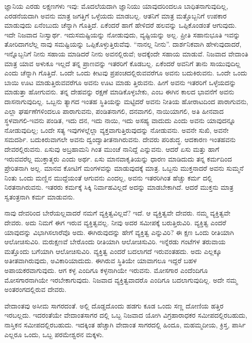 ಜ್ಞಾನಿಯ ಎರಡು ಲಕ್ಷಣಗಳು ಇವು: ಮೊದಲೆಯದಾಗಿ ಜ್ಞಾನಿಯು ಯಾವುದರಿಂದಲೂ ಬಾಧಿತನಾಗುವುದಿಲ್ಲ, ಎರಡನೆಯದಾಗಿ ಅವನು ಮಾತ್ರ ಜಗತ್ತಿಗೆ ಒಳ್ಳೆಯದು ಮಾಡಬಲ್ಲ. ಆತನಿಗೆ ಮಾತ್ರ ಮತ್ತೊಬ್ಬನಿಗೆ ಉಪಕಾರ ಮಾಡುವುದು ಏನೆಂಬುದು ಚೆನ್ನಾಗಿ ಗೊತ್ತಿದೆ. ಏಕೆಂದರೆ ಹಾಗೆ ಹೇಳಿದರೆ ಹಲವನ್ನು ಒಪ್ಪಿಕೊಂಡಂತೆ ಆಗುವುದು. ಇದೇ ನಿಜವಾದ ನಿಃಸ್ವಾರ್ಥ. ಇದುಸಮಷ್ಟಿಯನ್ನು ನೋಡುವುದು, ವ್ಯಷ್ಟಿಯನ್ನು ಅಲ್ಲ. ಪ್ರೀತಿ ಸಹಾನುಭೂತಿ ಇವನ್ನು ತೋರಿದಾಗಲೆಲ್ಲ ನಾವು ಸಮಷ್ಟಿಯನ್ನು ಒಪ್ಪಿಕೊಳ್ಳುತ್ತಿರುವೆವು. “ನಾನಲ್ಲ ನೀನು”. ದಾರ್ಶನಿಕವಾಗಿ ಹೇಳುವುದಾದರೆ, ಇನ್ನೊಬ್ಬನಿಗೆ ನೀನು ಸಹಾಯ ಮಾಡಿದರೆ ನೀನು ಅವನಲ್ಲಿರುವೆ; ಅದಕ್ಕೆಂದೇ ಸಹಾಯ ಮಾಡುವೆ. ನಿಜವಾದ ವೇದಾಂತಿ ಮಾತ್ರ ಯಾವ ಅಳುಕೂ ಇಲ್ಲದೆ ತನ್ನ ಪ್ರಾಣವನ್ನು ಇತರರಿಗೆ ಕೊಡಬಲ್ಲ. ಏಕೆಂದರೆ ಅವನಿಗೆ ತಾನು ಸಾಯುವುದಿಲ್ಲ ಎಂದು ಚೆನ್ನಾಗಿ ಗೊತ್ತಿದೆ. ಒಂದೇ ಒಂದು ಕೀಟವು ಪ್ರಪಂಚದಲ್ಲಿರುವವರೆಗೂ ಅವನು ಬದುಕಿರುವನು. ಒಂದೇ ಒಂದು ಬಾಯಿ ಊಟ ಮಾಡುತ್ತಿರುವವರೆಗೂ ಅವನು ಊಟ ಮಾಡು ತ್ತಿರುವನು. ಹೀಗೆ ಅವನು ಇತರರಿಗೆ ಒಳ್ಳೆಯದನ್ನು ಮಾಡುತ್ತಾ ಹೋಗುವನು. ತನ್ನ ದೇಹವನ್ನು ರಕ್ಷಣೆ ಮಾಡಿಕೊಳ್ಳಬೇಕು, ಎಂಬ ಈಗಿನ ಕಾಲದ ಭಾವನೆಗೆ ಅವನು ದಾಸನಾಗುವುದಿಲ್ಲ. ಒಬ್ಬನು ತ್ಯಾಗದ ಇಂತಹ ಸ್ಥಿತಿಯನ್ನು ಮಟ್ಟಿದರೆ ಅವನು ನೀತಿಯ ಹೋರಾಟದಿಂದ ಪಾರಾಗುವನು, ಎಲ್ಲಾ ಘರ್ಷಣೆಗಳಿಂದಲೂ ಪಾರಾಗುವನು, ಪಂಡಿತನಾಗಲಿ, ದನವಾಗಲಿ, ನಾಯಿಯಾಗಲಿ, ಅತಿ ಹೀನವಾದ ಸ್ಥಳವಾಗಲಿ-ಇವನು ಪಂಡಿತ, ಇದು ದನ, ಇದು ನಾಯಿ, ಇದು ಅಸಹ್ಯ ವಾದುದು ಎಂದು ಅವನು ಯಾವುದನ್ನೂ ನೋಡುವುದಿಲ್ಲ; ಒಂದೇ ಸತ್ಯ ಇವುಗಳಲ್ಲೆಲ್ಲಾ ವ್ಯಕ್ತವಾಗುತ್ತಿರುವುದನ್ನು ನೋಡುವನು. ಅವನೇ ಸುಖಿ, ಅವನೇ ಸಮದರ್ಶಿ. ಬದುಕಿರುವಾಗಲೇ ಅವನು ದ್ವಂದ್ವಾತೀತನಾಗಿರುವನು. ದೇವರು ಪರಿಶುದ್ಧ. ಆದಕಾರಣ ಇಂತಹವನು ದೇವರಲ್ಲಿರುವನು. ಏಸುವು ಅಬ್ರಹಾಮನಿ ಗಿಂತ ಮುಂಚೆ ನಾನಿದ್ದೆ ಎನ್ನುವನು. ಆದರೆ ಏಸು ಮತ್ತು ಹಾಗೆ ಇರುವವರೆಲ್ಲ ಮುಕ್ತಾತ್ಮರು ಎಂದು ಅರ್ಥ. ಏಸು ಮಾನವಾಕೃತಿಯನ್ನು ಧಾರಣ ಮಾಡಿದುದು ತನ್ನ ಕರ್ಮದಿಂದ ಪ್ರೇರಿತನಾಗಿ ಅಲ್ಲ. ಮಾನವ ಕೋಟಿಗೆ ಮಂಗಳವನ್ನು ಮಾಡುವುದಕ್ಕೆ ಮಾತ್ರ. ಒಬ್ಬನು ಮುಕ್ತನಾದರೆ ಅವನು ಸುಮ್ಮನೆ ನಿಂತು ಒಂದು ಮಣ್ಣಿನ ಮುದ್ದೆಯಂತೆ ಆಗುವನು ಎಂದಲ್ಲ, ಅವನು ಇತರರಿಗಿಂತ ಹೆಚ್ಚು ಕರ್ಮ ದಲ್ಲಿ ನಿರತನಾಗಿರುವನು. ಇತರರು ಕರ್ಮಕ್ಕೆ ಸಿಕ್ಕಿ ನಿರ್ವಾಹವಿಲ್ಲದೆ ಅದನ್ನು ಮಾಡಬೇಕಾಗಿದೆ. ಆದರೆ ಮುಕ್ತನು ಮಾತ್ರ ಸ್ವತಂತ್ರನಾಗಿ ಕರ್ಮ ಮಾಡುವನು.

ನಾವು ದೇವರಿಂದ ಬೇರೆಯಲ್ಲವಾದರೆ ನಮಗೆ ವ್ಯಕ್ತಿತ್ವವಿಲ್ಲವೆ? ಇದೆ. ಆ ವ್ಯಕ್ತಿತ್ವವೇ ದೇವರು. ನಮ್ಮ ವ್ಯಕ್ತಿತ್ವವೇ ದೇವರು. ಅದು ನಿಮಗೆ ಈಗ ಇರುವ ವ್ಯಕ್ತಿತ್ವವಲ್ಲ. ನೀವು ಅದರ ಸಮೀಪಕ್ಕೆ ಬರುತ್ತಿರುವಿರಿ. ವ್ಯಕ್ತಿತ್ವ ಎಂದರೆ ಯಾವುದನ್ನು ವಿಭಾಗಿಸಲಾರೆವೊ ಅದು. ಈಗಿರುವುದನ್ನು ಹೇಗೆ ವ್ಯಕ್ತಿತ್ವ ಎನ್ನುವಿರಿ? ಈ ಕ್ಷಣ ಒಂದು ರೀತಿಯಾಗಿ ಆಲೋಚಿಸುವಿರಿ. ಮರುಕ್ಷಣವೆ ಬೇರೊಂದು ರೀತಿಯಾಗಿ ಆಲೋಚಿಸುವಿರಿ. ಇನ್ನೆರಡು ಗಂಟೆಗಳ ತರುವಾಯ ಮತ್ತೊಂದು ಬಗೆಯಾಗಿ ಆಲೋಚಿಸುವಿರಿ. ವ್ಯಕ್ತಿತ್ವ ಎಂದರೆ ಬದಲಾಗದೆ ಇರುವಂತಹದು. ಅದು ಎಲ್ಲಕ್ಕೂ ಅತೀತವಾಗಿರುವುದು, ಅವಿಕಾರಿಯಾದುದು. ಈಗಿರುವ ಸ್ಥಿತಿಯೇ ಯಾವಾಗಲೂ ಇದ್ದರೆ ಬಹಳ ಅಪಾಯಕರವಾಗುವುದು. ಆಗ ಕಳ್ಳ ಎಂದಿಗೂ ಕಳ್ಳನಾಗಿಯೇ ಇರುವನು. ಮೋಸಗಾರ ಎಂದೆಂದಿಗೂ ಮೋಸಗಾರನಾಗಿಯೇ ಇರಬೇಕಾಗುವುದು. ನಿಜವಾದ ವ್ಯಕ್ತಿತ್ವವಾದರೊ ಎಂದಿಗೂ ಬದಲಾಗುವುದಿಲ್ಲ. ಅದೇ ನಮ್ಮ ಅಂತರಂಗದಲ್ಲಿರುವ ದೇವರು.

ವೇದಾಂತವು ಅಸೀಮ ಸಾಗರದಂತೆ. ಅಲ್ಲಿ ದೊಡ್ಡದೊಂದು ಹಡಗು ಕೂಡ ಒಂದು ಸಣ್ಣ ದೋಣಿಯ ಹತ್ತಿರ ಇರಬಲ್ಲದು. ಇದರಂತೆಯೇ ವೇದಾಂತಸಾಗರ ದಲ್ಲಿ ಒಬ್ಬ ನಿಜವಾದ ಯೋಗಿ ವಿಗ್ರಹಾರಾಧಕರ ಸಮೀಪದಲ್ಲಿರಬಹುದು, ನಾಸ್ತಿಕನ ಸಮೀಪದಲ್ಲಿರಬಹುದು. ಇದಕ್ಕಿಂತ ಹೆಚ್ಚಾಗಿ ವೇದಾಂತ ಸಾಗರದಲ್ಲಿ ಹಿಂದೂ, ಮಹಮ್ಮದೀಯ, ಕ್ರಿಸ್ತ, ಪಾರ್ಸಿ ಎಲ್ಲರೂ ಒಂದು, ಒಬ್ಬ ಪರಮೇಶ್ವರನ ಮಕ್ಕಳು.

